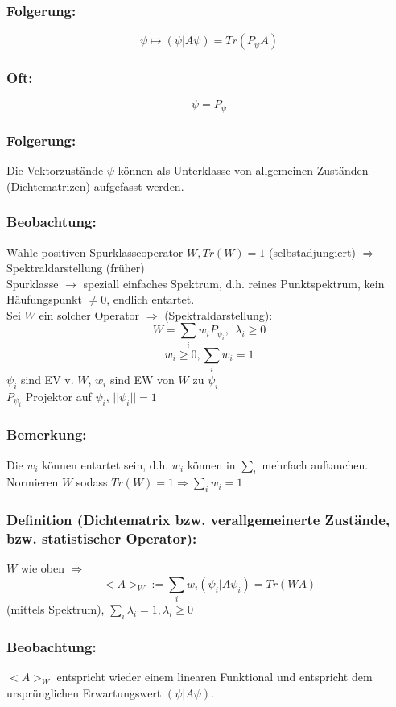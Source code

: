 \documentclass[twoside,a4paper]{scrartcl}
\renewcommand{\1}{\mathds{1}}
\newcommand{\Ra}{\Rightarrow}
\newcommand{\ra}{\rightarrow}
\renewcommand{\l}{\lambda}
\begin{document}
\subsubsection*{Folgerung:}
$$\psi \mapsto (\psi|A\psi)=Tr(P_\psi A)$$
\subsubsection*{Oft:}
$$\psi=P_\psi$$
\subsubsection*{Folgerung:}
Die Vektorzustände $\psi$ können als Unterklasse von allgemeinen Zuständen (Dichtematrizen) aufgefasst werden.
\subsubsection*{Beobachtung:}
Wähle \underline{positiven} Spurklasseoperator $W, Tr(W)=1$ (selbstadjungiert) $\Ra$ Spektraldarstellung (früher)\\
Spurklasse $\ra$ speziall einfaches Spektrum, d.h. reines Punktspektrum, kein Häufungspunkt $\neq 0$, endlich entartet.\\
Sei $W$ ein solcher Operator $\Ra$ (Spektraldarstellung):\\
$$W=\sum_i w_i P_{\psi_i}, \ \ \l_i\geq 0$$
$$w_i\geq 0, \sum_i w_i=1$$
$\psi_i$ sind EV v. $W$, $w_i$ sind EW von $W$ zu $\psi_i$\\

$P_{\psi_i}$ Projektor auf $\psi_i$, $||\psi_i||=1$
\subsubsection*{Bemerkung:}
Die $w_i$ können entartet sein, d.h. $w_i$ können in $\sum_i$ mehrfach auftauchen. Normieren $W$ sodass $Tr(W)=1 \Ra \sum_i w_i=1$

\subsubsection*{Definition (Dichtematrix bzw. verallgemeinerte Zustände, bzw. statistischer Operator):}
$W$ wie oben $\Ra$ $$<A>_W:=\sum_i w_i (\psi_i|A\psi_i)=Tr(WA)$$ (mittels Spektrum), $\sum_i \l_i=1, \l_i \geq 0$
\subsubsection*{Beobachtung:}
$<A>_W$ entspricht wieder einem linearen Funktional und entspricht dem ursprünglichen Erwartungswert $(\psi|A\psi)$.
\end{document}
